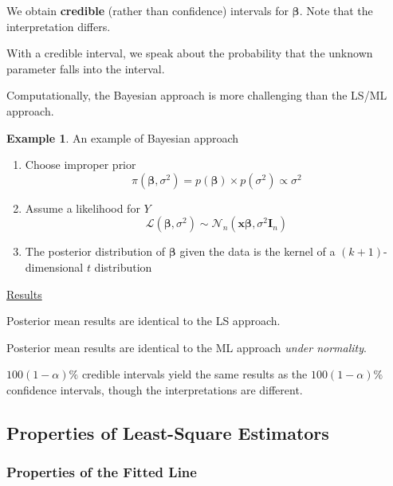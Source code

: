 \documentclass[11pt]{article}
\newcommand\VEC{\bm}{}
\theoremstyle{definition}
\newtheorem{example}{Example}[section]
\numberwithin{equation}{section}
\begin{document}
\begin{writenotes}
We obtain \textbf{credible} (rather than confidence) intervals for $\VEC{\beta}$. Note that the interpretation differs.

With a credible interval, we speak about the probability that the unknown parameter falls into the interval.

Computationally, the Bayesian approach is more challenging than the LS/ML approach.
\end{writenotes}

\begin{example} An example of Bayesian approach
  \begin{enumerate}
    \item Choose improper prior
    \begin{equation*}
      \pi(\VEC{\beta},\sigma^2)=p(\VEC{\beta})\times p(\sigma^2)\propto\sigma^2
    \end{equation*}
    \item Assume a likelihood for $Y$
    \begin{equation*}
      \mathcal{L}(\VEC{\beta},\sigma^2)\sim\mathcal{N}_n(\VEC{x\beta},\sigma^2\mathbf{I}_n)
    \end{equation*}
    \item The posterior distribution of $\VEC{\beta}$ given the data is the kernel of a $(k+1)$-dimensional $t$ distribution
  \end{enumerate}
  \begin{writenotes}
  
  \underline{Results}

  Posterior mean results are identical to the LS approach.

  Posterior mean results are identical to the ML approach \textit{under normality}.

  $100(1-\alpha)\%$ credible intervals yield the same results as the $100(1-\alpha)\%$ confidence intervals, though the interpretations are different.
  \end{writenotes}
\end{example}

\newpage
\subsection{Properties of Least-Square Estimators}
\subsubsection{Properties of the Fitted Line}
\end{document}
